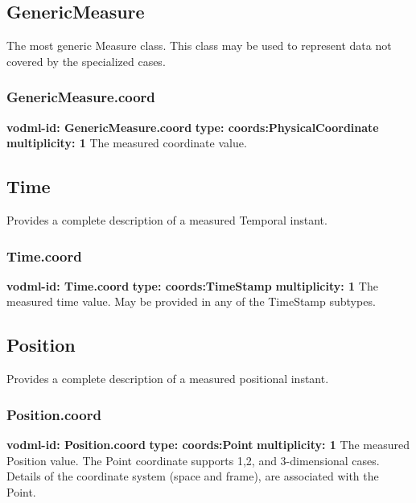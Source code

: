   \subsection{GenericMeasure}
  \label{sect:GenericMeasure}
    The most generic Measure class. This class may be used to represent data not covered by the specialized cases.

    \subsubsection{GenericMeasure.coord}
      \textbf{vodml-id: GenericMeasure.coord} \newline
      \textbf{type: coords:PhysicalCoordinate} \newline
      \textbf{multiplicity: 1} \newline 
      The measured coordinate value.

  \subsection{Time}
  \label{sect:Time}
    Provides a complete description of a measured Temporal instant.

    \subsubsection{Time.coord}
      \textbf{vodml-id: Time.coord} \newline
      \textbf{type: coords:TimeStamp} \newline
      \textbf{multiplicity: 1} \newline 
      The measured time value. May be provided in any of the TimeStamp subtypes.


  \subsection{Position}
  \label{sect:Position}
    Provides a complete description of a measured positional instant.

    \subsubsection{Position.coord}
      \textbf{vodml-id: Position.coord} \newline
      \textbf{type: coords:Point} \newline
      \textbf{multiplicity: 1} \newline 
      The measured Position value. The Point coordinate supports 1,2, and 3-dimensional cases. Details of the coordinate system (space and frame), are associated with the Point.



